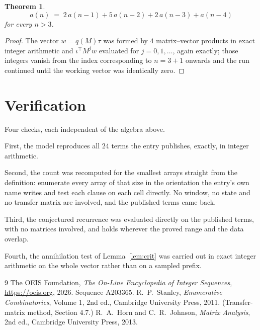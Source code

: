 \documentclass[11pt,a4paper]{article}
\theoremstyle{plain}
\newtheorem{theorem}{Theorem}
\theoremstyle{definition}
\begin{document}
\begin{theorem}
\[
a(n)\;=\;2\,a(n-1) + 5\,a(n-2) + 2\,a(n-3) + a(n-4)
\]
for every $n>3$.
\end{theorem}

\begin{proof}
The vector $w=q(M)\tau$ was formed by $4$ matrix--vector products in exact integer
arithmetic and $\iota^{\!\top}M^{j}w$ evaluated for $j=0,1,\dots$, again exactly; those
integers vanish from the index corresponding to $n=3+1$ onwards and the run continued
until the working vector was identically zero.
\end{proof}

\section{Verification}

Four checks, each independent of the algebra above.

First, the model reproduces all $24$ terms the entry publishes, exactly, in integer
arithmetic.

Second, the count was recomputed for the smallest arrays straight from the definition:
enumerate every array of that size in the orientation the entry's own name writes and test each
clause on each cell directly. No window, no state and no transfer matrix are involved, and the
published terms came back.

Third, the conjectured recurrence was evaluated directly on the published terms, with no
matrices involved, and holds wherever the proved range and the data overlap.

Fourth, the annihilation test of Lemma~\ref{lem:crit} was carried out in exact integer
arithmetic on the whole vector rather than on a sampled prefix.

\begin{thebibliography}{9}
 The OEIS Foundation, \emph{The On-Line Encyclopedia of Integer
Sequences}, \url{https://oeis.org}, 2026. Sequence A203365.
 R.~P.~Stanley, \emph{Enumerative Combinatorics}, Volume 1, 2nd ed.,
Cambridge University Press, 2011. (Transfer-matrix method, Section 4.7.)
 R.~A.~Horn and C.~R.~Johnson, \emph{Matrix Analysis}, 2nd ed., Cambridge
University Press, 2013.
\end{thebibliography}
\end{document}
